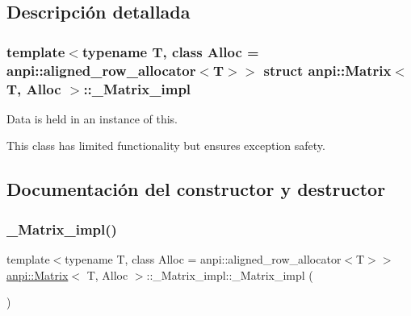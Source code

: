 \subsection{Descripción detallada}
\subsubsection*{template$<$typename T, class Alloc = anpi\+::aligned\+\_\+row\+\_\+allocator$<$\+T$>$$>$\newline
struct anpi\+::\+Matrix$<$ T, Alloc $>$\+::\+\_\+\+Matrix\+\_\+impl}

Data is held in an instance of this.

This class has limited functionality but ensures exception safety. 

\subsection{Documentación del constructor y destructor}
\mbox{\label{structanpi_1_1Matrix_1_1__Matrix__impl_a7ee30810c49444c8eb481d22c0a82274}} 
\subsubsection{\texorpdfstring{\+\_\+\+Matrix\+\_\+impl()}{\_Matrix\_impl()}\hspace{0.1cm}{\footnotesize\ttfamily [1/3]}}
{\footnotesize\ttfamily template$<$typename T, class Alloc = anpi\+::aligned\+\_\+row\+\_\+allocator$<$\+T$>$$>$ \\
\hyperlink{classanpi_1_1Matrix}{anpi\+::\+Matrix}$<$ T, Alloc $>$\+::\+\_\+\+Matrix\+\_\+impl\+::\+\_\+\+Matrix\+\_\+impl (\begin{DoxyParamCaption}{ }\end{DoxyParamCaption})}

\mbox{\label{structanpi_1_1Matrix_1_1__Matrix__impl_a1451d484426e27bf75cd914342f8cb20}} 
